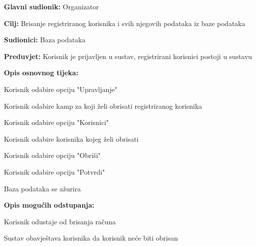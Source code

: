 					\noindent {}
					\begin{packed_item}
						
						\item \textbf{Glavni sudionik: }Organizator
						\item  \textbf{Cilj:} Brisanje registriranog korisnika i svih njegovih podataka iz baze podataka
						\item  \textbf{Sudionici:} Baza podataka
						\item  \textbf{Preduvjet:} Korisnik je prijavljen u sustav, registrirani korisnici postoji u sustavu
						\item  \textbf{Opis osnovnog tijeka:}
						
						\item[] \begin{packed_enum}
							
							\item Korisnik odabire opciju "Upravljanje"
							\item Korisnik odabire kamp za koji želi obrisati registriranog korisnika
							\item Korisnik odabire opciju "Korisnici"
							\item Korisnik odabire korisnika kojeg želi obrisati 
							\item Korisnik odabire opciju "Obriši"
							\item Korisnik odabire opciju "Potvrdi"
							\item Baza podataka se ažurira
						\end{packed_enum}
						
						\item  \textbf{Opis mogućih odstupanja:}
						
						\item[] \begin{packed_item}
							
							\item[2.a] Korisnik odustaje od brisanja računa
							\item[] \begin{packed_enum}
								
								\item Sustav obavještava korisnika da korisnik neće biti obrisan
								
							\end{packed_enum}
							
						\end{packed_item}
					\end{packed_item}
					
